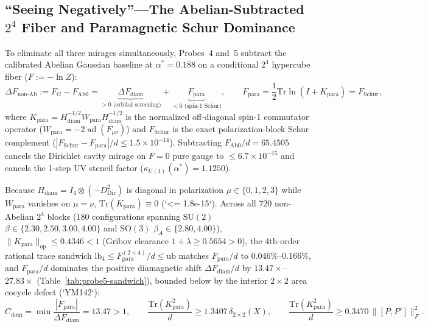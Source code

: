 \documentclass[11pt,a4paper]{article}
\newcommand{\SU}{\mathrm{SU}}
\newcommand{\tr}{\mathrm{Tr}}
\begin{document}
\subsection{``Seeing Negatively''---The Abelian-Subtracted $2^4$ Fiber and Paramagnetic Schur Dominance}
To eliminate all three mirages simultaneously, Probes~4 and~5 subtract the calibrated Abelian Gaussian baseline at $\alpha^* = 0.188$ on a conditional $2^4$ hypercube fiber ($F := -\ln Z$):
\begin{equation}
\Delta F_{\mathrm{non\text{-}Ab}} := F_G - F_{\mathrm{Ab}0}
= \underbrace{\Delta F_{\mathrm{diam}}}_{> 0\text{ (orbital screening)}} + \underbrace{F_{\mathrm{para}}}_{< 0\text{ (spin-1 Schur)}} ,
\qquad
F_{\mathrm{para}} = \frac{1}{2}\tr\ln(I + K_{\mathrm{para}}) = F_{\mathrm{Schur}},
\end{equation}
where $K_{\mathrm{para}} = H_{\mathrm{diam}}^{-1/2} W_{\mathrm{para}} H_{\mathrm{diam}}^{-1/2}$ is the normalized off-diagonal spin-1 commutator operator ($W_{\mathrm{para}} = -2\operatorname{ad}(F_{\mu\nu})$) and $F_{\mathrm{Schur}}$ is the exact polarization-block Schur complement ($|F_{\mathrm{Schur}} - F_{\mathrm{para}}|/d \le 1.5 \times 10^{-14}$). Subtracting $F_{\mathrm{Ab}0}/d = 65.4505$ cancels the Dirichlet cavity mirage on $F=0$ pure gauge to $\le 6.7 \times 10^{-15}$ and cancels the 1-step UV stencil factor ($\kappa_{U(1)}(\alpha^*) = 1.1250$).

Because $H_{\mathrm{diam}} = I_4 \otimes (-D_{\mathrm{Dir}}^2)$ is diagonal in polarization $\mu \in \{0,1,2,3\}$ while $W_{\mathrm{para}}$ vanishes on $\mu = \nu$, $\tr(K_{\mathrm{para}}) \equiv 0$ (`<= 1.8e-15`). Across all $720$ non-Abelian $2^4$ blocks ($180$ configurations spanning $\SU(2)$ $\beta \in \{2.30, 2.50, 3.00, 4.00\}$ and $\mathrm{SO}(3)$ $\beta_A \in \{2.80, 4.00\}$), $\|K_{\mathrm{para}}\|_{\mathrm{op}} \le 0.4346 < 1$ (Gribov clearance $1 + \lambda \ge 0.5654 > 0$), the 4th-order rational trace sandwich $\mathrm{lb}_4 \le F_{\mathrm{para}}^{(2+4)}/d \le \mathrm{ub}$ matches $F_{\mathrm{para}}/d$ to $0.046\%$--$0.166\%$, and $F_{\mathrm{para}}/d$ dominates the positive diamagnetic shift $\Delta F_{\mathrm{diam}}/d$ by $13.47\times$--$27.83\times$ (Table~\ref{tab:probe5-sandwich}), bounded below by the interior $2\times 2$ area cocycle defect (`YM142`):
\begin{equation}
C_{\mathrm{dom}} = \min \frac{|F_{\mathrm{para}}|}{\Delta F_{\mathrm{diam}}} = 13.47 > 1,
\qquad
\frac{\tr(K_{\mathrm{para}}^2)}{d} \ge 1.3407\,\delta_{2\times 2}(X),
\qquad
\frac{\tr(K_{\mathrm{para}}^2)}{d} \ge 0.3470\,\|[P, P']\|_F^2.
\end{equation}
\end{document}
